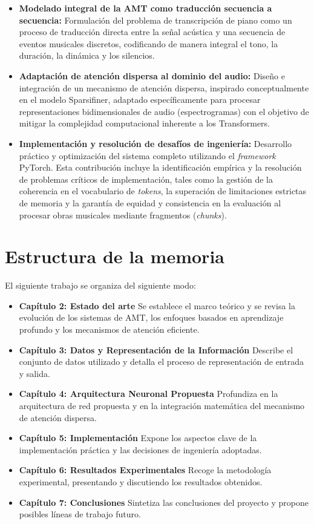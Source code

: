 \begin{itemize}
\item \textbf{Modelado integral de la AMT como traducción secuencia a secuencia:} Formulación del problema de transcripción de piano como un proceso de traducción directa entre la señal acústica y una secuencia de eventos musicales discretos, codificando de manera integral el tono, la duración, la dinámica y los silencios.

\item \textbf{Adaptación de atención dispersa al dominio del audio:} Diseño e integración de un mecanismo de atención dispersa, inspirado conceptualmente en el modelo Sparsifiner, adaptado específicamente para procesar representaciones bidimensionales de audio (espectrogramas) con el objetivo de mitigar la complejidad computacional inherente a los Transformers. 

\item \textbf{Implementación y resolución de desafíos de ingeniería:} Desarrollo práctico y optimización del sistema completo utilizando el \textit{framework} PyTorch. Esta contribución incluye la identificación empírica y la resolución de problemas críticos de implementación, tales como la gestión de la coherencia en el vocabulario de \textit{tokens}, la superación de limitaciones estrictas de memoria y la garantía de equidad y consistencia en la evaluación al procesar obras musicales mediante fragmentos (\textit{chunks}).
\end{itemize}

\section{Estructura de la memoria}

El siguiente trabajo se organiza del siguiente modo: 
\begin{itemize}
\item \textbf{Capítulo 2: Estado del arte} Se establece el marco teórico y se revisa la evolución de los sistemas de AMT, los enfoques basados en aprendizaje profundo y los mecanismos de atención eficiente.

\item \textbf{Capítulo 3: Datos y Representación de la Información} Describe el conjunto de datos utilizado y detalla el proceso de representación de entrada y salida. 

\item \textbf{Capítulo 4: Arquitectura Neuronal Propuesta} Profundiza en la arquitectura de red propuesta y en la integración matemática del mecanismo de atención dispersa. 

\item \textbf{Capítulo 5: Implementación} Expone los aspectos clave de la implementación práctica y las decisiones de ingeniería adoptadas. 

\item \textbf{Capítulo 6: Resultados Experimentales} Recoge la metodología experimental, presentando y discutiendo los resultados obtenidos. 

\item \textbf{Capítulo 7: Conclusiones} Sintetiza las conclusiones del proyecto y propone posibles líneas de trabajo futuro.
\end{itemize}